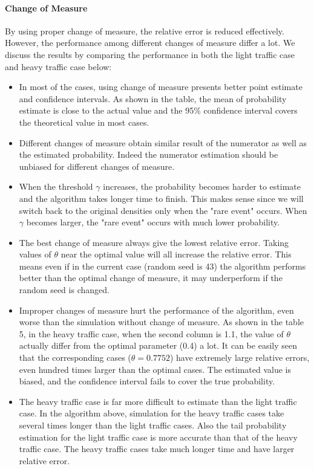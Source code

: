 \documentclass{article}
\begin{document}
\paragraph{Change of Measure}
By using proper change of measure, the relative error is reduced effectively. However, the performance among different changes of measure differ a lot. We discuss the results by comparing the performance in both the light traffic case and heavy traffic case below:
\begin{itemize}
	\item In most of the cases, using change of measure presents better point estimate and confidence intervals. As shown in the table, the mean of probability estimate is close to the actual value and the 95\% confidence interval covers the theoretical value in most cases.
	\item Different changes of measure obtain similar result of the numerator as well as the estimated probability. Indeed the numerator estimation should be unbiased for different changes of measure.
	\item When the threshold $\gamma$ increases, the probability becomes harder to estimate and the algorithm takes longer time to finish. This makes sense since we will switch back to the original densities only when the "rare event" occurs. When $\gamma$ becomes larger, the "rare event" occurs with much lower probability.
	\item The best change of measure always give the lowest relative error. Taking values of $\theta$ near the optimal value will all increase the relative error. This means even if in the current case (random seed is 43) the algorithm performs better than the optimal change of measure, it may underperform if the random seed is changed.
	\item Improper changes of measure hurt the performance of the algorithm, even worse than the simulation without change of measure. As shown in the table 5, in the heavy traffic case, when the second column is 1.1, the value of $\theta$ actually differ from the optimal parameter (0.4) a lot. It can be easily seen that the corresponding cases ($\theta = 0.7752$) have extremely large relative errors, even hundred times larger than the optimal cases. The estimated value is biased, and the confidence interval fails to cover the true probability.
	\item The heavy traffic case is far more difficult to estimate than the light traffic case. In the algorithm above, simulation for the heavy traffic cases take several times longer than the light traffic cases. Also the tail probability estimation for the light traffic case is more accurate than that of the heavy traffic case. The heavy traffic cases take much longer time and have larger relative error.
\end{itemize}
\end{document}
